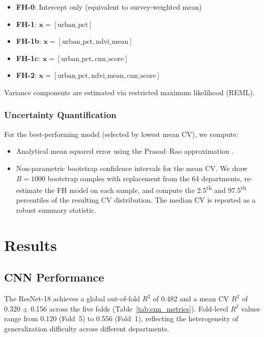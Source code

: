 \documentclass[11pt,a4paper]{article}
\newcommand{\Rtwo}{\ensuremath{R^2}}
\begin{document}
\begin{itemize}
    \item \textbf{FH-0}: Intercept only (equivalent to survey-weighted mean)
    \item \textbf{FH-1}: $\mathbf{x} = [\text{urban\_pct}]$
    \item \textbf{FH-1b}: $\mathbf{x} = [\text{urban\_pct}, \text{ndvi\_mean}]$
    \item \textbf{FH-1c}: $\mathbf{x} = [\text{urban\_pct}, \text{cnn\_score}]$
    \item \textbf{FH-2}: $\mathbf{x} = [\text{urban\_pct}, \text{ndvi\_mean}, \text{cnn\_score}]$
\end{itemize}

Variance components are estimated via restricted maximum likelihood (REML).

\subsubsection{Uncertainty Quantification}
For the best-performing model (selected by lowest mean CV), we compute:
\begin{itemize}
    \item Analytical mean squared error using the Prasad--Rao approximation \citep{prasad1990}.
    \item Non-parametric bootstrap confidence intervals for the mean CV. We draw $B = 1000$ bootstrap samples with replacement from the 64 departments, re-estimate the FH model on each sample, and compute the 2.5\textsuperscript{th} and 97.5\textsuperscript{th} percentiles of the resulting CV distribution. The median CV is reported as a robust summary statistic.
\end{itemize}

\section{Results}
\label{sec:results}

\subsection{CNN Performance}

The ResNet-18 achieves a global out-of-fold \Rtwo{} of 0.482 and a mean CV \Rtwo{} of 0.320 $\pm$ 0.156 across the five folds (Table~\ref{tab:cnn_metrics}). Fold-level \Rtwo{} values range from 0.120 (Fold~5) to 0.556 (Fold~1), reflecting the heterogeneity of generalization difficulty across different departments.
\end{document}
